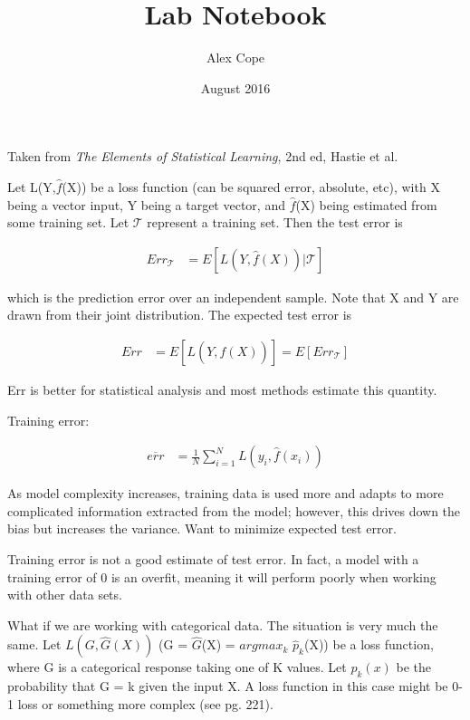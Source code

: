 \documentclass[11pt]{labbook}
\title{Lab Notebook}
\author{Alex Cope}
\date{August 2016}
\newcommand{\Loss}[2]{L\left(#1,#2\right)}
\begin{document}
\maketitle
\let\cleardoublepage\clearpage
\tableofcontents
{}
 

Taken from \textit{The Elements of Statistical Learning}, 2nd ed, Hastie et al.
 
Let L(Y,$\hat{f}$(X)) be a loss function (can be squared error, absolute, etc), with X being a vector input, Y being a target vector, and $\hat{f}$(X) being estimated from some training set. Let $\mathcal{T}$ represent a training set. Then the test error is

\begin{align*}
Err_\mathcal{T} &= E\left[L\left(Y,\hat{f}(X)\right)|\mathcal{T}\right]
\end{align*}

which is the prediction error over an independent sample. Note that X and Y are drawn from their joint distribution. The expected test error is 

\begin{align*}
Err &= E\left[L\left(Y,\hat{f}(X)\right)\right] = E\left[Err_\mathcal{T}\right]
\end{align*}

Err is better for statistical analysis and most methods estimate this quantity. 
\newline

Training error:

\begin{align*}
\overline{err} &= \frac{1}{N}\sum_{i=1}^{N}\Loss{y_i}{\hat{f}(x_i)}
\end{align*}


As model complexity increases, training data is used more and adapts to more complicated information extracted from the model; however, this drives down the bias but increases the variance. Want to minimize expected test error. 

Training error is not a good estimate of test error. In fact, a model with a training error of 0 is an overfit, meaning it will perform poorly when working with other data sets. 

What if we are working with categorical data. The situation is very much the same. Let $\Loss{G}{\hat{G}(X)}$ (G = $\hat{G}$(X) = $argmax_k$ $\hat{p}_k$(X)) be a loss function, where G is a categorical response taking one of K values. Let $p_k(x)$ be the probability that G = k given the input X. A loss function in this case might be 0-1 loss or something more complex (see pg. 221).
\end{document}
